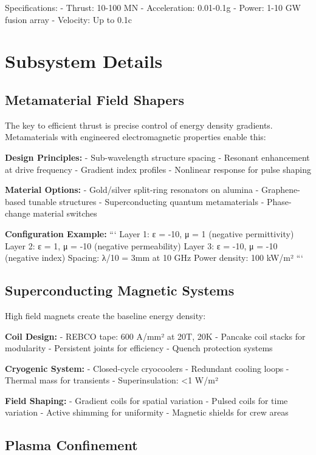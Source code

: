 \documentclass[12pt,letterpaper]{book}
\theoremstyle{definition}
\theoremstyle{plain}
\theoremstyle{remark}
\begin{document}
{{{{{Specifications:
- Thrust: 10-100 MN
- Acceleration: 0.01-0.1g
- Power: 1-10 GW fusion array
- Velocity: Up to 0.1c

\section{Subsystem Details}

\subsection{Metamaterial Field Shapers}

The key to efficient thrust is precise control of energy density gradients. Metamaterials with engineered electromagnetic properties enable this:

\textbf{Design Principles:}
- Sub-wavelength structure spacing
- Resonant enhancement at drive frequency
- Gradient index profiles
- Nonlinear response for pulse shaping

\textbf{Material Options:}
- Gold/silver split-ring resonators on alumina
- Graphene-based tunable structures
- Superconducting quantum metamaterials
- Phase-change material switches

\textbf{Configuration Example:}
```
Layer 1: ε = -10, μ = 1    (negative permittivity)
Layer 2: ε = 1, μ = -10    (negative permeability)  
Layer 3: ε = -10, μ = -10  (negative index)
Spacing: λ/10 = 3mm at 10 GHz
Power density: 100 kW/m²
```

\subsection{Superconducting Magnetic Systems}

High field magnets create the baseline energy density:

\textbf{Coil Design:}
- REBCO tape: 600 A/mm² at 20T, 20K
- Pancake coil stacks for modularity
- Persistent joints for efficiency
- Quench protection systems

\textbf{Cryogenic System:}
- Closed-cycle cryocoolers
- Redundant cooling loops
- Thermal mass for transients
- Superinsulation: <1 W/m²

\textbf{Field Shaping:}
- Gradient coils for spatial variation
- Pulsed coils for time variation
- Active shimming for uniformity
- Magnetic shields for crew areas

\subsection{Plasma Confinement}

}}}}}
\end{document}
